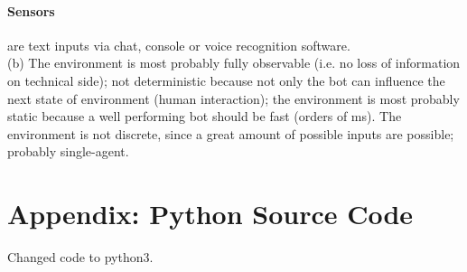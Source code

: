\documentclass[11pt,a4paper,twoside]{article}
\begin{document}
\paragraph{Sensors} are text inputs via chat, console or voice recognition software.\\
(b) The environment is most probably fully observable (i.e. no loss of information on technical side); not deterministic because not only the bot can influence the next state of environment (human interaction); the environment is most probably static because a well performing bot should be fast (orders of ms).
The environment is not discrete, since a great amount of possible inputs are possible; probably single-agent.



\newpage
\section{Appendix: Python Source Code}
Changed code to python3.

\end{document}
